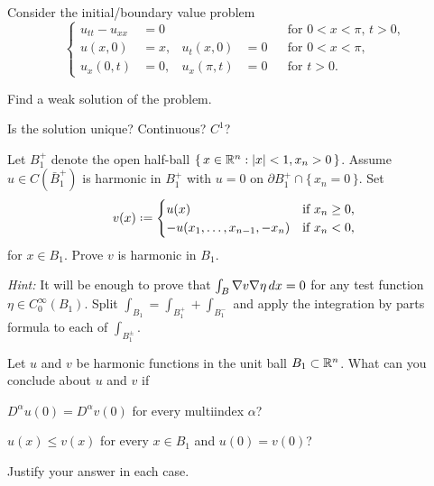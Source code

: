 \begin{problem}
  Consider the initial/boundary value problem
    \[
     \left\{
       \begin{aligned}
         u_{tt}-u_{xx}&=0&&&&\text{for \(0<x<\pi\), \(t>0\),}\\
         u(x,0)&=x,&u_t(x,0)&=0&&\text{for \(0<x<\pi\),}\\
         u_x(0,t)&=0,&u_x(\pi,t)&=0&&\text{for \(t>0\).}
      \end{aligned}
    \right.
  \]
  \begin{alphlist}
  \item Find a weak solution of the problem.
  \item Is the solution unique? Continuous? \(C^1\)?
  \end{alphlist}
\end{problem}
\begin{solution*}
\end{solution*}

\begin{problem}
  Let \(B_1^+\) denote the open half-ball
  \(\{\,x\in\mathbb{R}^n:|x|<1,x_n>0\,\}\). Assume \(u\in C(\bar B_1^+)\) is
  harmonic in \(B_1^+\) with \(u=0\) on \(\partial
  B_1^+\cap\{\,x_n=0\,\}\). Set
  \[
    v(x)\defeq
    \begin{cases}
      u(x)&\text{if \(x_n\geq 0\),}\\
      -u(x_1,\dotsc,x_{n-1},-x_n)&\text{if \(x_n<0\),}
    \end{cases}
  \]
  for \(x\in B_1\). Prove \(v\) is harmonic in \(B_1\).

  \noindent\emph{Hint:} It will be enough to prove that
  \(\int_B\nabla v\nabla\eta\mathop{}\!d x=0\) for any test function
  \(\eta\in C^\infty_0(B_1)\). Split
  \(\int_{B_1}=\int_{B_1^+}+\int_{B_1^-}\) and apply the integration by
  parts formula to each of \(\int_{B_1^\pm}\).
\end{problem}
\begin{solution*}
\end{solution*}

\begin{problem}
  Let \(u\) and \(v\) be harmonic functions in the unit ball
  \(B_1\subset\mathbb{R}^n\). What can you conclude about \(u\) and \(v\) if
  \begin{alphlist}
  \item \(D^\alpha u(0)=D^\alpha v(0)\) for every multiindex \(\alpha\)?
  \item \(u(x)\leq v(x)\) for every \(x\in B_1\) and \(u(0)=v(0)\)?
  \end{alphlist}
  Justify your answer in each case.
\end{problem}
\begin{solution*}
\end{solution*}

